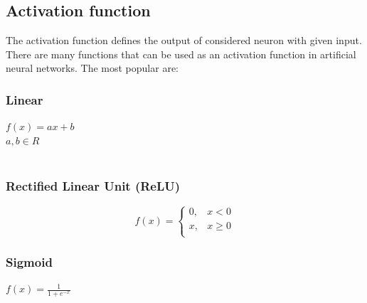 \subsection{Activation function}
The activation function defines the output of considered neuron with given input. There are many functions that can be used as an activation function in artificial neural networks. The most popular are:
\subsubsection{Linear}
\begin{center}
$ f(x)=ax + b $ \\ $ a,b \in R $ \\~\\
\end{center}

\subsubsection{Rectified Linear Unit (ReLU)}
\[
f(x)=
\left\{
\begin{array}{ll}
      0 ,& x < 0 \\
      x ,& x\geq 0 \\
\end{array} 
\right. \]
\begin{center}
\end{center}

\subsubsection{Sigmoid}
\begin{center}
$f(x) = \frac{1}{1 + e^{-x}}$ \\
\end{center}

